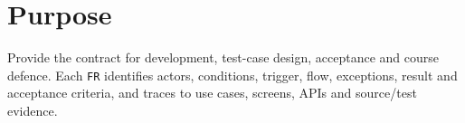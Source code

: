 \clearpage
\section{Purpose}\label{sec:srs-2}
Provide the contract for development, test-case design, acceptance and course defence. Each \texttt{FR} identifies actors, conditions, trigger, flow, exceptions, result and acceptance criteria, and traces to use cases, screens, APIs and source/\allowbreak{}test evidence.
